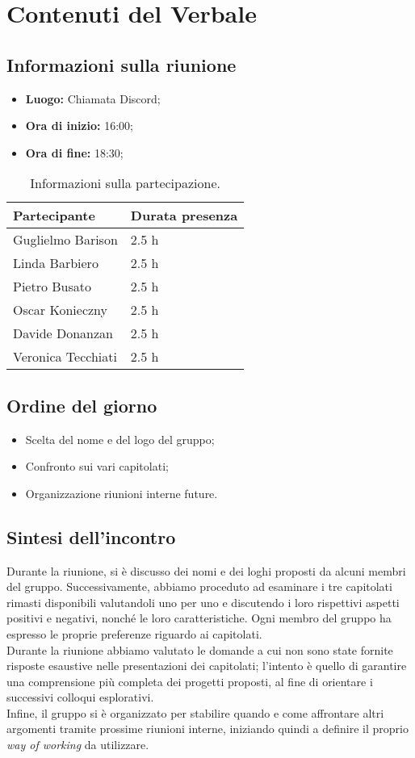 \section{Contenuti del Verbale}
\subsection{Informazioni sulla riunione}
\begin{itemize}
	\setlength\itemsep{0em}
	\item\textbf{Luogo:} Chiamata Discord;
	\item\textbf{Ora di inizio:} 16:00;
	\item\textbf{Ora di fine:}  18:30;
\end{itemize}
\begin{table}[ht!]
	\begin{tabular}{p{3cm} p{3cm}}
		\toprule
		\textbf{Partecipante} & \textbf{Durata presenza} \\
		\midrule
		Guglielmo Barison & 2.5 h \\
		Linda Barbiero &  2.5 h \\
		Pietro Busato & 2.5 h \\
		Oscar Konieczny & 2.5 h \\
		Davide Donanzan & 2.5 h \\
		Veronica Tecchiati & 2.5 h \\
		\bottomrule
	\end{tabular}
	\caption{Informazioni sulla partecipazione.}
	\label{table:Informazioni sulla partecipazione}
\end{table}
\subsection{Ordine del giorno}
\begin{itemize}
	\setlength\itemsep{0em}
	\item Scelta del nome e del logo del gruppo;	
	\item Confronto sui vari capitolati;
	\item Organizzazione riunioni interne future.
\end{itemize}
\subsection{Sintesi dell'incontro}
Durante la riunione, si è discusso dei nomi e dei loghi proposti da alcuni membri del gruppo. 
Successivamente, abbiamo proceduto ad esaminare i tre capitolati rimasti disponibili valutandoli uno per uno e discutendo i loro rispettivi aspetti positivi e negativi, nonché le loro caratteristiche. Ogni membro del gruppo ha espresso le proprie preferenze riguardo ai capitolati. \\
Durante la riunione abbiamo valutato le domande a cui non sono state fornite risposte esaustive nelle presentazioni dei capitolati; l'intento è quello di garantire una comprensione più completa dei progetti proposti, al fine di orientare i successivi colloqui esplorativi. \\
Infine, il gruppo si è organizzato per stabilire quando e come affrontare altri argomenti tramite prossime riunioni interne, iniziando quindi a definire il proprio \textit{way of working} da utilizzare.
